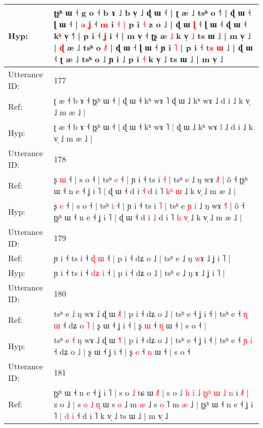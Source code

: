 \documentclass[10pt]{article}
\DeclareRobustCommand{\hl}[1]{{\textcolor{red}{#1}}}
\begin{document}
\begin{longtable}{ll}
 \\
Hyp: & ʈʂʰ ɯ ˧\hl{}\hl{} g o ˧ b ɤ ˩ b v̩ ˩\hl{}\hl{} ɖ\hl{}\hl{}\hl{}\hl{}\hl{}\hl{} ɯ ˧ | ʈ æ ˩ tsʰ o ˧\hl{˥} | ɖ ɯ ˧ ɭ ɯ ˧ | \hl{ə} \hl{}\hl{ʝ} ˧ \hl{m} i\hl{ }\hl{˧} \hl{|} p i \hl{˧} z o ˩ | ɖ ɯ\hl{ }\hl{ɭ} ˧ ɭ ɯ ˧ ɖ ɯ ˧ k\hl{ʰ} v̩ ˧\hl{}\hl{}\hl{}\hl{}\hl{}˥\hl{}\hl{}\hl{}\hl{}\hl{}\hl{}\hl{} | p i ˧ \hl{ʝ} i\hl{} ˧ | m v̩ ˧ ʈʂ æ \hl{˩} k v̩ \hl{˩} ts ɯ ˩ | m v̩ ˩ | \hl{ɖ} æ ˩ tsʰ o \hl{˩}\hl{˥} | ɖ ɯ ˧ ɭ ɯ ˧ ɲ i \hl{˥} | p i ˧ \hl{t}\hl{s} \hl{ɯ} ˩ | ɖ ɯ ˧ ʈ æ ˩ tsʰ o ˩ ɲ i ˩ p i \hl{˧} k v̩ ˩ ts ɯ ˩ | m v̩ ˩
 \\
\midrule
Utterance ID: & 177 \\
Ref: & ʈ æ ˧ b ɤ ˧ ʈʂʰ ɯ ˧ | ɖ ɯ ˧ kʰ wɤ ˥\hl{}\hl{} ɖ ɯ ˩ kʰ wɤ\hl{}\hl{} ˩ d i ˩ k v̩ ˩ m æ ˩ |
 \\
Hyp: & ʈ æ ˧ b ɤ ˧ ʈʂʰ ɯ ˧ | ɖ ɯ ˧ kʰ wɤ ˥\hl{ }\hl{|} ɖ ɯ ˩ kʰ wɤ\hl{ }\hl{l} ˩ d i ˩ k v̩ ˩ m æ ˩ |
 \\
\midrule
Utterance ID: & 178 \\
Ref: & ʂ \hl{ɯ} ˧ | s o ˧ | tsʰ \hl{e} ˧ | ɲ i ˧ ts i \hl{˧} | tsʰ e\hl{}\hl{}\hl{}\hl{} ˩ ŋ wɤ \hl{˩}˥ | õ ˧ ʈʂʰ ɯ ˧ n e ˧ ʝ i ˥ | ɖ ɯ ˧ d i \hl{˧} d i ˥ \hl{k}\hl{ʰ}\hl{ }\hl{ɯ} ˩ k v̩ ˩ m æ ˩ |
 \\
Hyp: & ʂ \hl{e} ˧ | s o ˧ | tsʰ \hl{i} ˧ | ɲ i ˧ ts i \hl{˥} | tsʰ e\hl{ }\hl{ɲ}\hl{ }\hl{i} ˩ ŋ wɤ \hl{˧}˥ | õ ˧ ʈʂʰ ɯ ˧ n e ˧ ʝ i ˥ | ɖ ɯ ˧ d i \hl{˩} d i ˥ \hl{h}\hl{ }\hl{v}\hl{̩} ˩ k v̩ ˩ m æ ˩ |
 \\
\midrule
Utterance ID: & 179 \\
Ref: & ɲ i ˧ ts i ˧ \hl{}\hl{ɖ} \hl{ɯ} ˧ | p i ˧ dʑ o ˩ | tsʰ e ˩ ŋ \hl{w}ɤ ˩ ʝ i ˥ |
 \\
Hyp: & ɲ i ˧ ts i ˧ \hl{d}\hl{ʑ} \hl{i} ˧ | p i ˧ dʑ o ˩ | tsʰ e ˩ ŋ \hl{}ɤ ˩ ʝ i ˥ |
 \\
\midrule
Utterance ID: & 180 \\
Ref: & tsʰ e \hl{˩} ŋ wɤ ˩ ɖ ɯ \hl{˩}˥ | p i ˧ dʑ o ˩ | tsʰ e ˧ ʝ i ˧ | tsʰ e ˧ \hl{ɳ} \hl{ɯ} ˧ dʑ o \hl{˥} | ʂ ɯ ˧ ʝ i ˧ | ʂ \hl{ɯ} ˧ \hl{ɳ} ɯ ˧ | s o ˧\hl{ }\hl{|}
 \\
Hyp: & tsʰ e \hl{˧} ŋ wɤ ˩ ɖ ɯ \hl{˧}˥ | p i ˧ dʑ o ˩ | tsʰ e ˧ ʝ i ˧ | tsʰ e ˧ \hl{ɲ} \hl{i} ˧ dʑ o \hl{˩} | ʂ ɯ ˧ ʝ i ˧ | ʂ \hl{e} ˧ \hl{n} ɯ ˧ | s o ˧\hl{}\hl{}
 \\
\midrule
Utterance ID: & 181 \\
Ref: & ʈʂʰ ɯ ˧ n e ˧ ʝ i ˥ | s o \hl{˩} tɕ ɯ \hl{˩}\hl{˥} | s o \hl{˩} \hl{}\hl{h} \hl{i}\hl{̃} \hl{˩} \hl{ʈ}\hl{ʂ}\hl{ʰ} \hl{ɯ} \hl{˩} \hl{n} i \hl{˩}˥ | z o ˩ | s\hl{ }\hl{o}\hl{ }\hl{˩}\hl{ }\hl{ɳ} ɯ s \hl{o} ˩ m \hl{}\hl{æ} ˩ s \hl{o} ˥ m \hl{æ} ˩ | ʈʂʰ ɯ ˧ n e ˧ ʝ i ˥ | \hl{d} \hl{i} ˧ d i ˥ k v̩ ˩ ts ɯ ˩ | m v̩ ˩

\end{longtable}
\end{document}
